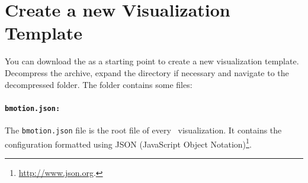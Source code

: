 \section{Create a new Visualization Template}
\label{vis_template}

You can download the  as a starting point to create a new visualization template.
Decompress the archive, expand the directory if necessary and navigate to the decompressed folder.
The folder contains some files:



\paragraph{\texttt{bmotion.json:}}
The \texttt{bmotion.json} file is the root file of every \bms\ visualization.
It contains the configuration formatted using JSON (JavaScript Object Notation)\footnote{\url{http://www.json.org}.}.


